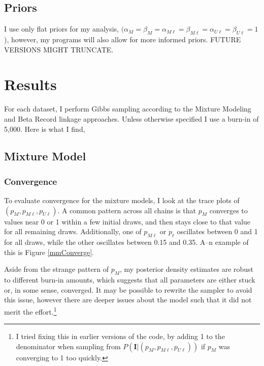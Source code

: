 \documentclass[11pt,reqno]{amsart}
\newcommand\params{(p_M, p_{M\ell}, p_{U\ell})}
\begin{document}
\subsection{Priors} I use only flat priors for my analysis, $(\alpha_M=\beta_M=\alpha_{M\ell}=\beta_{M\ell}=\alpha_{U\ell}=\beta_{U\ell}=1$), however, my programs will also allow for more informed priors.  FUTURE VERSIONS MIGHT TRUNCATE. %


\section{Results}

For each dataset, I perform Gibbs sampling according to the Mixture Modeling and Beta Record linkage approaches.  Unless otherwise specified I use a burn-in of 5,000. Here is what I find, 

\subsection{Mixture Model} 

\subsubsection{Convergence} To evaluate convergence for the mixture models, I look at the trace plots of $\params$.  A common pattern across all chains is that $p_M$ converges to values near 0 or 1 within a few initial draws, and then stays close to that value for all remaining draws.  Additionally, one of $p_{M\ell}$ or $p_{\ell}$ oscillates between 0 and 1 for all draws, while the other oscillates between 0.15 and 0.35.  A--n example of this is Figure \ref{mmConverge}. 
  
Aside from the strange pattern of $p_M$, my posterior density estimates are robust to different burn-in amounts, which suggests that all parameters are either stuck or, in some sense, converged.  It may be possible to rewrite the sampler to avoid this issue,  however there are deeper issues about the model such that it did not merit the effort.\footnote{I tried fixing this in earlier versions of the code, by adding 1 to the denominator when sampling from $P(\mathbf{I} | \params)$ if $p_M$ was converging to 1 too quickly.} 
\end{document}
